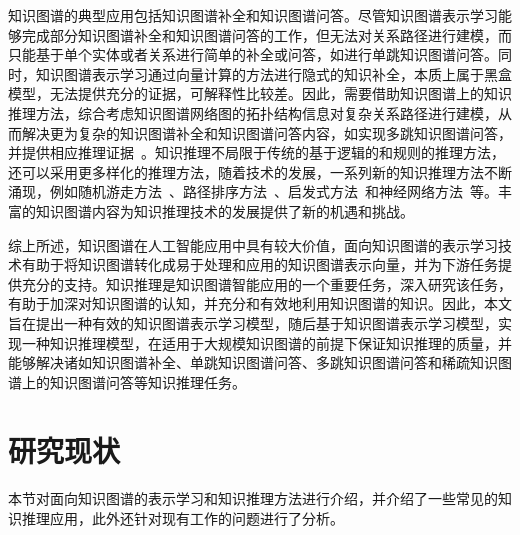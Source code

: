 \documentclass[algorithmlist, AutoFakeBold, AutoFakeSlant, figurelist, tablelist, nomlist, engineering]{seuthesix}
\begin{document}
知识图谱的典型应用包括知识图谱补全和知识图谱问答。尽管知识图谱表示学习能够完成部分知识图谱补全和知识图谱问答的工作，但无法对关系路径进行建模，而只能基于单个实体或者关系进行简单的补全或问答，如进行单跳知识图谱问答。同时，知识图谱表示学习通过向量计算的方法进行隐式的知识补全，本质上属于黑盒模型，无法提供充分的证据，可解释性比较差。因此，需要借助知识图谱上的知识推理方法，综合考虑知识图谱网络图的拓扑结构信息对复杂关系路径进行建模，从而解决更为复杂的知识图谱补全和知识图谱问答内容，如实现多跳知识图谱问答，并提供相应推理证据~\cite{chen2020review}。知识推理不局限于传统的基于逻辑的和规则的推理方法，还可以采用更多样化的推理方法，随着技术的发展，一系列新的知识推理方法不断涌现，例如随机游走方法~\cite{jagvaral2020path}、路径排序方法~\cite{zhao2021target}、启发式方法~\cite{he2021heuristic}和神经网络方法~\cite{wang2018deep}等。丰富的知识图谱内容为知识推理技术的发展提供了新的机遇和挑战。

综上所述，知识图谱在人工智能应用中具有较大价值，面向知识图谱的表示学习技术有助于将知识图谱转化成易于处理和应用的知识图谱表示向量，并为下游任务提供充分的支持。知识推理是知识图谱智能应用的一个重要任务，深入研究该任务，有助于加深对知识图谱的认知，并充分和有效地利用知识图谱的知识。因此，本文旨在提出一种有效的知识图谱表示学习模型，随后基于知识图谱表示学习模型，实现一种知识推理模型，在适用于大规模知识图谱的前提下保证知识推理的质量，并能够解决诸如知识图谱补全、单跳知识图谱问答、多跳知识图谱问答和稀疏知识图谱上的知识图谱问答等知识推理任务。

\section{研究现状}
本节对面向知识图谱的表示学习和知识推理方法进行介绍，并介绍了一些常见的知识推理应用，此外还针对现有工作的问题进行了分析。
\end{document}
